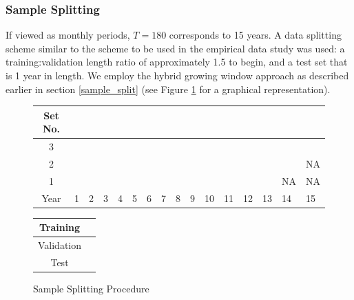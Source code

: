 \documentclass{article}
\begin{document}
\subsubsection{Sample Splitting}

If viewed as monthly periods, $T = 180$ corresponds to 15 years. A data splitting scheme similar to the scheme to be used in the empirical data study was used: a training:validation length ratio of approximately 1.5 to begin, and a test set that is 1 year in length. We employ the hybrid growing window approach as described earlier in section \ref{sample_split} (see Figure \ref{sample_split_diag} for a graphical representation).

\begin{figure}[!htb]
	\begin{center}
		\begin{tabular}{|c|p{0.40cm}p{0.40cm}p{0.40cm}p{0.40cm}p{0.40cm}p{0.40cm}p{0.40cm}p{0.40cm}p{0.40cm}p{0.40cm}p{0.40cm}p{0.40cm}p{0.40cm}p{0.40cm}p{0.40cm}|}
			\hline
			Set No. &&&&&&&&&&&&&&& \\
			\hline
			3 & \cellcolor{cyan} & \cellcolor{cyan} & \cellcolor{cyan} & \cellcolor{cyan} & \cellcolor{cyan} & \cellcolor{cyan} & \cellcolor{cyan} & \cellcolor{cyan} & \cellcolor{cyan} &
			\cellcolor{pink} & \cellcolor{pink} & \cellcolor{pink} & \cellcolor{pink} & \cellcolor{pink} & 	
			\cellcolor{olive} \\
			2 & \cellcolor{cyan} & \cellcolor{cyan} & \cellcolor{cyan} & \cellcolor{cyan} & \cellcolor{cyan} & \cellcolor{cyan} & \cellcolor{cyan} & \cellcolor{cyan} &
			\cellcolor{pink} & \cellcolor{pink} & \cellcolor{pink} & \cellcolor{pink} & \cellcolor{pink} & 	
			\cellcolor{olive} & NA  \\
			1 & \cellcolor{cyan} & \cellcolor{cyan} & \cellcolor{cyan} & \cellcolor{cyan} & \cellcolor{cyan} & \cellcolor{cyan} & \cellcolor{cyan} &
			\cellcolor{pink} & \cellcolor{pink} & \cellcolor{pink} & \cellcolor{pink} & \cellcolor{pink} & 	
			\cellcolor{olive} & NA & NA \\
			\hline
			Year & 1 & 2 & 3 & 4 & 5 & 6 & 7 & 8 & 9 & 10 & 11 & 12 & 13 & 14 & 15\\
			\hline
		\end{tabular}
		\medskip
		\begin{tabular}{|c|p{0.40cm}|}
			\hline
			Training & \cellcolor{cyan} \\
			\hline
			Validation & \cellcolor{pink} \\
			\hline
			Test & \cellcolor{olive} \\
			\hline
		\end{tabular}
	\end{center}
	\caption{Sample Splitting Procedure}
	\label{sample_split_diag}
\end{figure}
\end{document}
